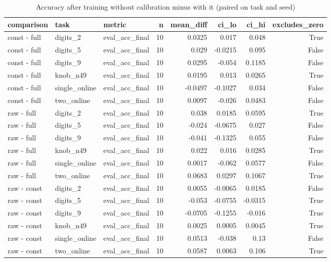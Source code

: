 \begin{table}[t]
\centering
\small
\begin{tabular}{lllrrrrr}
\toprule
comparison & task & metric & n & mean\_diff & ci\_lo & ci\_hi & excludes\_zero \\
\midrule
const - full & digits\_2 & eval\_acc\_final & 10 & 0.0325 & 0.017 & 0.048 & True \\
const - full & digits\_5 & eval\_acc\_final & 10 & 0.029 & -0.0215 & 0.095 & False \\
const - full & digits\_9 & eval\_acc\_final & 10 & 0.0295 & -0.054 & 0.1185 & False \\
const - full & knob\_n49 & eval\_acc\_final & 10 & 0.0195 & 0.013 & 0.0265 & True \\
const - full & single\_online & eval\_acc\_final & 10 & -0.0497 & -0.1027 & 0.034 & False \\
const - full & two\_online & eval\_acc\_final & 10 & 0.0097 & -0.026 & 0.0483 & False \\
raw - full & digits\_2 & eval\_acc\_final & 10 & 0.038 & 0.0185 & 0.0595 & True \\
raw - full & digits\_5 & eval\_acc\_final & 10 & -0.024 & -0.0675 & 0.027 & False \\
raw - full & digits\_9 & eval\_acc\_final & 10 & -0.041 & -0.1325 & 0.055 & False \\
raw - full & knob\_n49 & eval\_acc\_final & 10 & 0.022 & 0.016 & 0.0285 & True \\
raw - full & single\_online & eval\_acc\_final & 10 & 0.0017 & -0.062 & 0.0577 & False \\
raw - full & two\_online & eval\_acc\_final & 10 & 0.0683 & 0.0297 & 0.1067 & True \\
raw - const & digits\_2 & eval\_acc\_final & 10 & 0.0055 & -0.0065 & 0.0185 & False \\
raw - const & digits\_5 & eval\_acc\_final & 10 & -0.053 & -0.0755 & -0.0315 & True \\
raw - const & digits\_9 & eval\_acc\_final & 10 & -0.0705 & -0.1255 & -0.016 & True \\
raw - const & knob\_n49 & eval\_acc\_final & 10 & 0.0025 & 0.0005 & 0.0045 & True \\
raw - const & single\_online & eval\_acc\_final & 10 & 0.0513 & -0.038 & 0.13 & False \\
raw - const & two\_online & eval\_acc\_final & 10 & 0.0587 & 0.0063 & 0.106 & True \\
\bottomrule
\end{tabular}
\caption{Accuracy after training without calibration minus with it (paired on task and seed)}
\label{tab:nocalib_paired}
\end{table}